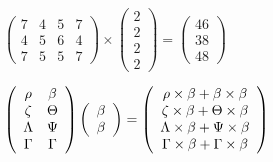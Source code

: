 \documentclass[12pt]{article}
\begin{document}
 
 
\noindent{}
 
 

 
$\left( \begin{array}{ccccccccccccccc}
           7 & 
           4 & 
           5 & 
           7 \\ 
           4 & 
           5 & 
           6 & 
           4 \\ 
           7 & 
           5 & 
           5 & 
           7
\end{array}\right) \times
\left( \begin{array}{c}
           2 \\ 
           2 \\ 
           2 \\ 
           2
\end{array}\right)  =
\left( \begin{array}{c}
          46 \\ 
          38 \\ 
          48
\end{array}\right)  $
 
$  %
 \left( \begin{array}
 {
 c
 c
 }
 \rho & 
 \beta \\ 
                    \zeta & 
 \Theta \\ 
 \Lambda & 
 \Psi \\ 
 \Gamma & 
 \Gamma
 \end{array} \right)
 \left( \begin{array}
 {
 c
 }
 \beta \\ 
 \beta
 \end{array} \right)
=
  \left( \begin{array}
 {
 c
 }
 \rho \times  \beta   +  \beta \times  \beta \\ 
                    \zeta \times  \beta   +  \Theta \times  \beta \\ 
 \Lambda \times  \beta   +  \Psi \times  \beta \\ 
 \Gamma \times  \beta   +  \Gamma \times  \beta
 \end{array} \right)
$
 
 
 
\noindent{}
 
 

 
 
 
\noindent{}
 
\end{document}
